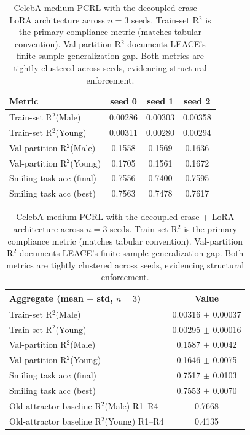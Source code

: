 \begin{table}[t]
  \centering
  \caption{CelebA-medium PCRL with the decoupled erase + LoRA architecture
  across $n{=}3$ seeds. Train-set R$^2$ is the primary compliance metric
  (matches tabular convention). Val-partition R$^2$ documents LEACE's
  finite-sample generalization gap. Both metrics are tightly clustered
  across seeds, evidencing structural enforcement.}
  \label{tab:celeba-final-multiseed}
  \begin{tabular}{lccc}
    \toprule
    Metric & seed 0 & seed 1 & seed 2 \\
    \midrule
    Train-set R$^2$(Male) & 0.00286 & 0.00303 & 0.00358 \\
    Train-set R$^2$(Young) & 0.00311 & 0.00280 & 0.00294 \\
    \midrule
    Val-partition R$^2$(Male) & 0.1558 & 0.1569 & 0.1636 \\
    Val-partition R$^2$(Young) & 0.1705 & 0.1561 & 0.1672 \\
    \midrule
    Smiling task acc (final) & 0.7556 & 0.7400 & 0.7595 \\
    Smiling task acc (best) & 0.7563 & 0.7478 & 0.7617 \\
    \bottomrule
  \end{tabular}
  \vspace{0.6em}
  \begin{tabular}{lc}
    \toprule
    Aggregate (mean $\pm$ std, $n{=}3$) & Value \\
    \midrule
    Train-set R$^2$(Male)  & 0.00316 $\pm$ 0.00037 \\
    Train-set R$^2$(Young) & 0.00295 $\pm$ 0.00016 \\
    Val-partition R$^2$(Male)  & 0.1587 $\pm$ 0.0042 \\
    Val-partition R$^2$(Young) & 0.1646 $\pm$ 0.0075 \\
    Smiling task acc (final)   & 0.7517 $\pm$ 0.0103 \\
    Smiling task acc (best)    & 0.7553 $\pm$ 0.0070 \\
    Old-attractor baseline R$^2$(Male)  R1--R4 & 0.7668 \\
    Old-attractor baseline R$^2$(Young) R1--R4 & 0.4135 \\
    \bottomrule
  \end{tabular}
\end{table}
